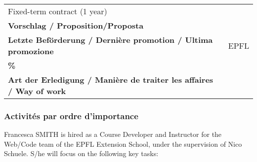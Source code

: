 \documentclass[
]{article}
\begin{document}
\begin{longtable}[]{@{}lc@{}}
\begin{minipage}[t]{0.50\columnwidth}
Fixed-term contract (1 year)\strut
\end{minipage}\tabularnewline
\begin{minipage}[t]{0.44\columnwidth}\raggedright
\textbf{Vorschlag / Proposition/Proposta}\strut
\end{minipage} & \begin{minipage}[t]{0.50\columnwidth}\centering
\strut
\end{minipage}\tabularnewline
\begin{minipage}[t]{0.44\columnwidth}\raggedright
\textbf{Letzte Beförderung / Dernière promotion / Ultima
promozione}\strut
\end{minipage} & \begin{minipage}[t]{0.50\columnwidth}\centering
EPFL\strut
\end{minipage}\tabularnewline
\begin{minipage}[t]{0.44\columnwidth}\raggedright
\textbf{\%}\strut
\end{minipage} & \begin{minipage}[t]{0.50\columnwidth}\centering
\strut
\end{minipage}\tabularnewline
\begin{minipage}[t]{0.44\columnwidth}\raggedright
\textbf{Art der Erledigung / Manière de traiter les affaires / Way of
work}\strut
\end{minipage} & \begin{minipage}[t]{0.50\columnwidth}\centering
\strut
\end{minipage}\tabularnewline
\bottomrule
\end{longtable}

\hypertarget{activituxe9s-par-ordre-dimportance}{%
\subsubsection{Activités par ordre
d'importance}\label{activituxe9s-par-ordre-dimportance}}

Francesca SMITH is hired as a Course Developer and Instructor for the
Web/Code team of the EPFL Extension School, under the supervision of
Nico Schuele. S/he will focus on the following key tasks:
\end{document}
